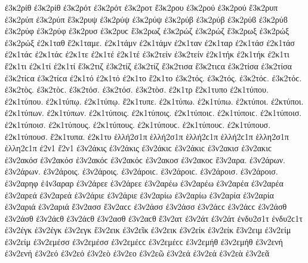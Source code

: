 {ἐ3κ2ρίθ ἐ3κ2ρίθ
ἐ3κ2ρότ ἐ3κ2ρότ   %
ἐ3κ2ροτ
ἔ3κ2ρου   %
ἐ3κ2ρού ἐ3κ2ρού
ἔ3κ2ρυπ   %
ἐ3κ2ρύπ ἐ3κ2ρύπ   %
ἔ3κ2ρυψ
ἐ3κ2ρύψ ἐ3κ2ρύψ
ἐ3κ2ρύβ ἐ3κ2ρύβ ἐ3κ2ρύϐ ἐ3κ2ρύϐ
ἐ3κ2ρύφ ἐ3κ2ρύφ
ἐ3κ2ρυσ ἐ3κ2ρυϲ   %
ἔ3κ2ρωζ   %
ἐ3κ2ρώζ ἐ3κ2ρώζ
ἔ3κ2ρωξ   %
ἐ3κ2ρώξ ἐ3κ2ρώξ
ἐ2κ1ταθ   %
ἔ2κ1ταμε.   %
ἐ2κ1τάμν ἐ2κ1τάμν   %
ἐ2κ1ταν   %
ἐ2κ1ταρ   %
ἐ2κ1τάσ ἐ2κ1τάσ ἐ2κ1τάϲ ἐ2κ1τάϲ   %
ἐ2κ1τε
ἐ2κ1τέ ἐ2κ1τέ
ἐ3κ2τείν ἐ3κ2τείν   %
ἐ2κ1τήκ ἐ2κ1τήκ   %
ἐ2κ1τι
ἔ2κ1τι
ἐ2κ1τί ἐ2κ1τί
ἔ3κ2τιζ   %
ἐ3κ2τίζ ἐ3κ2τίζ
ἔ3κ2τισα ἔ3κ2τιϲα   %
ἐ3κ2τίσα ἐ3κ2τίσα ἐ3κ2τίϲα ἐ3κ2τίϲα
ἐ2κ1τό ἐ2κ1τό
ἐ2κ1το
ἔ2κ1το
ἐ3κ2τός. ἐ3κ2τός. ἐ3κ2τόϲ. ἐ3κ2τόϲ.   %
ἐ3κ2τὸς. ἐ3κ2τὸϲ.
ἐ3κ2τόσ. ἐ3κ2τόσ.
ἐ3κ2τὸσ.
ἐ2κ1τρ
ἔ2κ1τυπο   %
ἐ2κ1τύπου. ἐ2κ1τύπου.
ἐ2κ1τύπῳ. ἐ2κ1τύπῳ.
ἔ2κ1τυπε.
ἐ2κ1τύπω. ἐ2κ1τύπω.
ἐ2κτύποι. ἐ2κτύποι.
ἐ2κ1τύπων. ἐ2κ1τύπων.
ἐ2κ1τύποις. ἐ2κ1τύποις. ἐ2κ1τύποιϲ. ἐ2κ1τύποιϲ.
ἐ2κ1τύποισ. ἐ2κ1τύποισ.
ἐ2κ1τύπους. ἐ2κ1τύπους. ἐ2κ1τύπουϲ. ἐ2κ1τύπουϲ.
ἐ2κ1τύπουσ. ἐ2κ1τύπουσ.
ἔ2κ1τυπα.
ἐ2κ1τυ
ἑλλή2σ1π ἑλλή2σ1π ἑλλή2ϲ1π ἑλλή2ϲ1π   %
ἑλλη2σ1π ἑλλη2ϲ1π
ἐ2ν1
ἔ2ν1
ἐ3ν2άκις ἐ3ν2άκις ἐ3ν2άκιϲ ἐ3ν2άκιϲ   %
ἐ3ν2ακισ ἐ3ν2ακιϲ   %
ἐ3ν2ακόσ ἐ3ν2ακόσ ἐ3ν2ακόϲ ἐ3ν2ακόϲ   %
ἐ3ν2ακοσ ἐ3ν2ακοϲ
ἔ3ν2αρα.   %
ἐ3ν2άρων. ἐ3ν2άρων.
ἐ3ν2άροις. ἐ3ν2άροις. ἐ3ν2άροιϲ. ἐ3ν2άροιϲ.
ἐ3ν2άροισ. ἐ3ν2άροισ.
ἐ3ν2αρηφ   %
ἐ4ν3αραρ   %
ἐ3ν2άρεε ἐ3ν2άρεε   %
ἐ3ν2αρέω ἐ3ν2αρέω
ἐ3ν2αρέα ἐ3ν2αρέα   %
ἐ3ν2αρεά ἐ3ν2αρεά
ἐ3ν2άριε ἐ3ν2άριε   %
ἐ3ν2αρίω ἐ3ν2αρίω
ἐ3ν2αρία ἐ3ν2αρία   %
ἐ3ν2αριά ἐ3ν2αριά
ἔ3ν2ασσ ἔ3ν2αϲϲ   %
ἐ3ν2άσσ ἐ3ν2άσσ ἐ3ν2άϲϲ ἐ3ν2άϲϲ
ἐ3ν2άσθ ἐ3ν2άσθ ἐ3ν2άϲθ ἐ3ν2άϲθ
ἐ3ν2ασθ ἐ3ν2αϲθ
ἔ3ν2ατ   %
ἐ3ν2άτ ἐ3ν2άτ
ἐνδυ2σ1τ ἐνδυ2ϲ1τ   %
ἐ3ν2έγκ ἐ3ν2έγκ   %
ἐ3ν2εγκ   %
ἔ3ν2εικ   %
ἐ3ν2εῖκ   %
ἐ3ν2εικ   %
ἐ3ν2είκ ἐ3ν2είκ   %
ἔ3ν2ειμ   %
ἐ3ν2είμ ἐ3ν2είμ
ἐ3ν2εμέσσ ἐ3ν2εμέσσ ἐ3ν2εμέϲϲ ἐ3ν2εμέϲϲ   %
ἐ3ν2εμήθ ἐ3ν2εμήθ   %
ἐ3ν2ενή ἐ3ν2ενή   %
ἐ3ν2εό ἐ3ν2εό   %
ἐ3ν2εὸ
ἐ3ν2εο
ἐ3ν2εῶ
ἐ3ν2εά ἐ3ν2εά
ἐ3ν2εὰ
ἐ3ν2εᾶ
}
